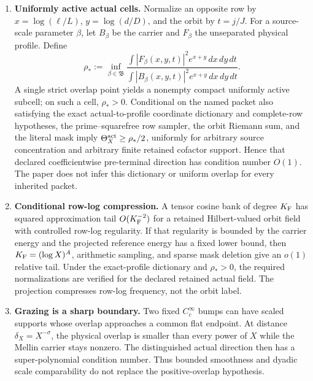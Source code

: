 \begin{enumerate}[label=\textup{(R\arabic*)},leftmargin=3.2em]
 \item \textbf{Uniformly active actual cells.}
 Normalize an opposite row by
 \(x=\log(\ell/L)\), \(y=\log(d/D)\), and the orbit by \(t=j/J\).
 For a source-scale parameter \(\beta\), let \(B_\beta\) be the carrier
 and \(F_\beta\) the unseparated physical profile.  Define
 \begin{equation}
 \rho_*
  :=\inf_{\beta\in\mathfrak B}
  \frac{\displaystyle\int|F_\beta(x,y,t)|^2
                       e^{x+y}\,dx\,dy\,dt}
       {\displaystyle\int|B_\beta(x,y,t)|^2
                       e^{x+y}\,dx\,dy\,dt}.
  \label{eq:tpc52-intro-overlap}
 \end{equation}
 A single strict overlap point yields a nonempty compact uniformly active
 subcell; on such a cell, \(\rho_*>0\).  Conditional on the named packet
 also satisfying the exact actual-to-profile coordinate dictionary and
 complete-row hypotheses, the prime--squarefree row sampler, the orbit
 Riemann sum, and the literal mask imply
 \(\Theta_X^{\rm act}\ge\rho_*/2\), uniformly for arbitrary source
 concentration and arbitrary finite retained cofactor support.  Hence that
 declared coefficientwise pre-terminal
 direction has condition number \(O(1)\).  The paper does not infer this
 dictionary or uniform overlap for every inherited packet.

 \item \textbf{Conditional row-log compression.}
 A tensor cosine bank of degree \(K_{\rm F}\) has squared approximation tail
 \(O(K_{\rm F}^{-2})\) for a retained Hilbert-valued orbit field with controlled
 row-log regularity.  If that regularity is bounded by the carrier energy
 and the projected reference energy has a fixed lower bound, then
 \(K_{\rm F}=(\log X)^A\), arithmetic sampling, and sparse mask deletion
 give an \(o(1)\) relative tail.  Under the exact-profile dictionary and
 \(\rho_*>0\), the required normalizations are verified for the declared
 retained actual field.  The projection compresses row-log frequency, not
 the orbit label.

 \item \textbf{Grazing is a sharp boundary.}
 Two fixed \(C_c^\infty\) bumps can have scaled supports whose overlap
 approaches a common flat endpoint.  At distance
 \(\delta_X=X^{-\sigma}\), the physical overlap is smaller than every
 power of \(X\) while the Mellin carrier stays nonzero.  The
 distinguished actual direction then has a super-polynomial condition
 number.  Thus bounded smoothness and dyadic scale comparability do not
 replace the positive-overlap hypothesis.
\end{enumerate}

